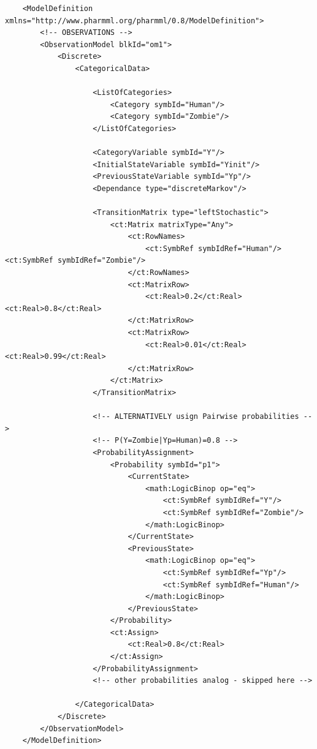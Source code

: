 \lstset{language=XML}
\begin{lstlisting}
    <ModelDefinition xmlns="http://www.pharmml.org/pharmml/0.8/ModelDefinition">
        <!-- OBSERVATIONS -->
        <ObservationModel blkId="om1">
            <Discrete>
                <CategoricalData>
                    
                    <ListOfCategories> 
                        <Category symbId="Human"/>
                        <Category symbId="Zombie"/>
                    </ListOfCategories>
                    
                    <CategoryVariable symbId="Y"/>
                    <InitialStateVariable symbId="Yinit"/> 
                    <PreviousStateVariable symbId="Yp"/>
                    <Dependance type="discreteMarkov"/>
                    
                    <TransitionMatrix type="leftStochastic">
                        <ct:Matrix matrixType="Any">
                            <ct:RowNames>
                                <ct:SymbRef symbIdRef="Human"/><ct:SymbRef symbIdRef="Zombie"/>
                            </ct:RowNames>
                            <ct:MatrixRow>
                                <ct:Real>0.2</ct:Real><ct:Real>0.8</ct:Real>
                            </ct:MatrixRow>
                            <ct:MatrixRow>
                                <ct:Real>0.01</ct:Real><ct:Real>0.99</ct:Real>
                            </ct:MatrixRow>
                        </ct:Matrix>
                    </TransitionMatrix>
                    
                    <!-- ALTERNATIVELY usign Pairwise probabilities -->
                    <!-- P(Y=Zombie|Yp=Human)=0.8 -->
                    <ProbabilityAssignment>
                        <Probability symbId="p1">
                            <CurrentState>
                                <math:LogicBinop op="eq">
                                    <ct:SymbRef symbIdRef="Y"/>
                                    <ct:SymbRef symbIdRef="Zombie"/>
                                </math:LogicBinop>
                            </CurrentState>
                            <PreviousState>
                                <math:LogicBinop op="eq">
                                    <ct:SymbRef symbIdRef="Yp"/>
                                    <ct:SymbRef symbIdRef="Human"/>
                                </math:LogicBinop>
                            </PreviousState>
                        </Probability>
                        <ct:Assign>
                            <ct:Real>0.8</ct:Real>
                        </ct:Assign>
                    </ProbabilityAssignment>
                    <!-- other probabilities analog - skipped here -->
                    
                </CategoricalData>
            </Discrete>
        </ObservationModel>
    </ModelDefinition>
\end{lstlisting}
